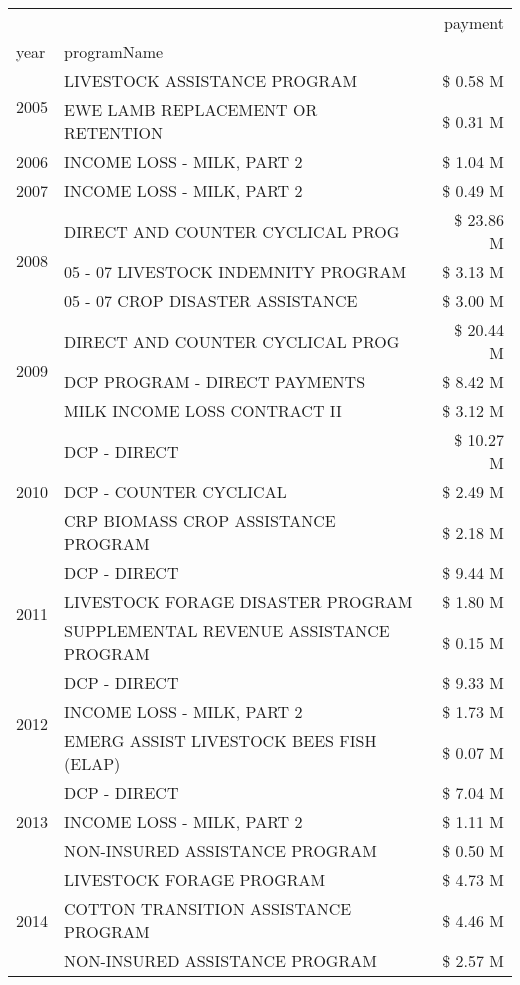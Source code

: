 \begin{tabular}{llr}
\toprule
 &  & payment \\
year & programName &  \\
\midrule
\multirow[t]{2}{*}{2005} & LIVESTOCK ASSISTANCE PROGRAM & \$ 0.58 M \\
 & EWE LAMB REPLACEMENT OR RETENTION & \$ 0.31 M \\
\cline{1-3}
2006 & INCOME LOSS - MILK, PART 2 & \$ 1.04 M \\
\cline{1-3}
2007 & INCOME LOSS - MILK, PART 2 & \$ 0.49 M \\
\cline{1-3}
\multirow[t]{3}{*}{2008} & DIRECT AND COUNTER CYCLICAL PROG & \$ 23.86 M \\
 & 05 - 07 LIVESTOCK INDEMNITY PROGRAM & \$ 3.13 M \\
 & 05 - 07 CROP DISASTER ASSISTANCE & \$ 3.00 M \\
\cline{1-3}
\multirow[t]{3}{*}{2009} & DIRECT AND COUNTER CYCLICAL PROG & \$ 20.44 M \\
 & DCP PROGRAM - DIRECT PAYMENTS & \$ 8.42 M \\
 & MILK INCOME LOSS CONTRACT II & \$ 3.12 M \\
\cline{1-3}
\multirow[t]{3}{*}{2010} & DCP - DIRECT & \$ 10.27 M \\
 & DCP - COUNTER CYCLICAL & \$ 2.49 M \\
 & CRP BIOMASS CROP ASSISTANCE PROGRAM & \$ 2.18 M \\
\cline{1-3}
\multirow[t]{3}{*}{2011} & DCP - DIRECT & \$ 9.44 M \\
 & LIVESTOCK FORAGE DISASTER PROGRAM & \$ 1.80 M \\
 & SUPPLEMENTAL REVENUE ASSISTANCE PROGRAM & \$ 0.15 M \\
\cline{1-3}
\multirow[t]{3}{*}{2012} & DCP - DIRECT & \$ 9.33 M \\
 & INCOME LOSS - MILK, PART 2 & \$ 1.73 M \\
 & EMERG ASSIST LIVESTOCK BEES FISH (ELAP) & \$ 0.07 M \\
\cline{1-3}
\multirow[t]{3}{*}{2013} & DCP - DIRECT & \$ 7.04 M \\
 & INCOME LOSS - MILK, PART 2 & \$ 1.11 M \\
 & NON-INSURED ASSISTANCE PROGRAM & \$ 0.50 M \\
\cline{1-3}
\multirow[t]{3}{*}{2014} & LIVESTOCK FORAGE PROGRAM & \$ 4.73 M \\
 & COTTON TRANSITION ASSISTANCE PROGRAM & \$ 4.46 M \\
 & NON-INSURED ASSISTANCE PROGRAM & \$ 2.57 M \\

\end{tabular}
